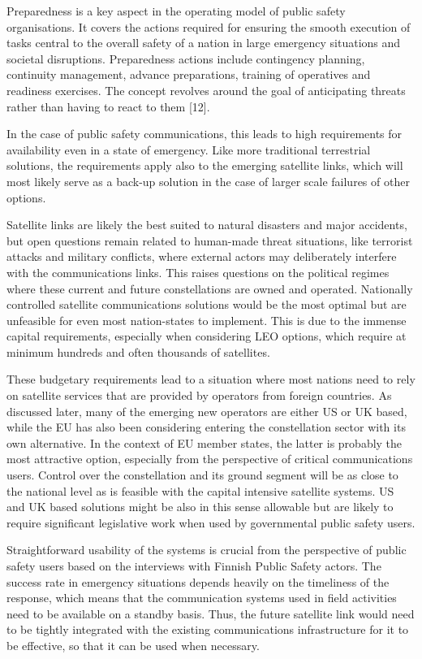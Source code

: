 \documentclass[english, 12pt, a4paper, elec, utf8, a-1b, online]{aaltothesis}
\begin{document}
Preparedness is a key aspect in the operating model of public safety organisations. It covers the actions required for ensuring the smooth execution of tasks central to the overall safety of a nation in large emergency situations and societal disruptions. Preparedness actions include contingency planning, continuity management, advance preparations, training of operatives and readiness exercises. The concept revolves around the goal of anticipating threats rather than having to react to them [12]. %

In the case of public safety communications, this leads to high requirements for availability even in a state of emergency.
Like more traditional terrestrial solutions, the requirements apply also to the emerging satellite links, which will most likely serve as a back-up solution in the case of larger scale failures of other options.

Satellite links are likely the best suited to natural disasters and major accidents, but open questions remain related to human-made threat situations, like terrorist attacks and military conflicts, where external actors may deliberately interfere with the communications links.
This raises questions on the political regimes where these current and future constellations are owned and operated. Nationally controlled satellite communications solutions would be the most optimal but are unfeasible for even most nation-states to implement. This is due to the immense capital requirements, especially when considering LEO options, which require at minimum hundreds and often thousands of satellites.

These budgetary requirements lead to a situation where most nations need to rely on satellite services that are provided by operators from foreign countries. As discussed later, many of the emerging new operators are either US or UK based, while the EU has also been considering entering the constellation sector with its own alternative. In the context of EU member states, the latter is probably the most attractive option, especially from the perspective of critical communications users. Control over the constellation and its ground segment will be as close to the national level as is feasible with the capital intensive satellite systems. US and UK based solutions might be also in this sense allowable but are likely to require significant legislative work when used by governmental public safety users.

Straightforward usability of the systems is crucial from the perspective of public safety users based on the interviews with Finnish Public Safety actors. The success rate in emergency situations depends heavily on the timeliness of the response, which means that the communication systems used in field activities need to be available on a standby basis. Thus, the future satellite link would need to be tightly integrated with the existing communications infrastructure for it to be effective, so that it can be used when necessary.
\end{document}
